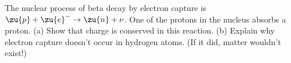 The nuclear process of beta decay by electron capture
        is
        $\zu{p}+\zu{e}^- \rightarrow \zu{n}+\nu$. One of the protons in the nucleus absorbs a proton.\hwendpart
        (a) Show that charge is conserved in this
        reaction. \hwendpart
        (b) Explain why electron capture doesn't occur in
        hydrogen atoms. (If it did, matter wouldn't exist!)
